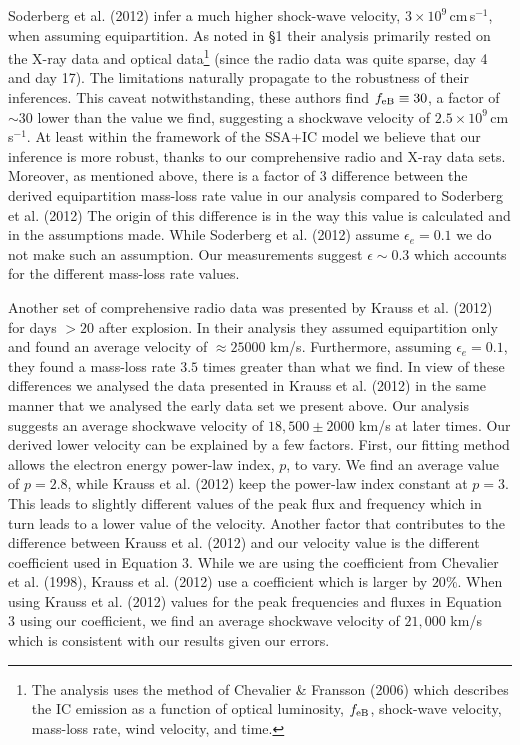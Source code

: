 \documentclass{emulateapj}
\begin{document}
Soderberg et al. (2012) infer a much higher shock-wave velocity, $3\times
10^9$\,cm\,s$^{-1}$, when assuming equipartition. As noted in \S1
their analysis primarily rested on the X-ray data and optical data\footnote{
The analysis uses the method of Chevalier
\& Fransson (2006) which describes the IC emission as a function of optical
luminosity, $f_{\rm eB}$, shock-wave velocity, mass-loss rate, wind
velocity, and time.} 
(since the
radio data was quite sparse, day 4 and day 17). The limitations 
naturally propagate to the robustness of their inferences. This caveat notwithstanding, 
these authors find $f_{\rm eB}\equiv 30$, a factor of $\sim 30$ lower
than the value we find, suggesting a shockwave velocity of $2.5 \times 10^9$\,cm\,s$^{-1}$.  At least within the framework of the SSA+IC
 model we believe that our inference is more robust, thanks to our comprehensive
 radio and X-ray data sets. Moreover, as mentioned above, there is a
 factor of $3$ difference between the derived equipartition mass-loss
 rate value in our analysis compared to Soderberg et al. (2012) The origin of
 this difference is in the way this value is calculated and in the
 assumptions made. While Soderberg et al. (2012) assume $\epsilon_{e}=0.1$
 we do not make such an assumption. Our measurements suggest
 $\epsilon \sim 0.3$ which accounts for the different mass-loss rate
 values. 
 
Another set of comprehensive radio data was presented by Krauss et
al. (2012) for days $>20$ after explosion. In their analysis they
assumed equipartition only and found an average velocity of $\approx
25000$ km/s. Furthermore, assuming $\epsilon_{e}=0.1$, they found a
mass-loss rate $3.5$ times greater than what we find. In view of these
differences we analysed the data presented in Krauss et al. (2012) in
the same manner that we analysed the early data set we present above. Our
analysis suggests an average shockwave velocity of $18,500\pm 2000$
km/s at later times. Our derived lower velocity can be explained by a
few factors. First, our fitting method allows the electron energy
power-law index, $p$, to vary. We find an average value of $p=2.8$,
while Krauss et al. (2012) keep the power-law index constant at $p=3$. This
leads to slightly different values of the peak flux and frequency
which in turn leads to a lower value of the velocity. Another factor
that contributes to the difference between Krauss et al. (2012) and our
velocity value is the different coefficient used in Equation
$3$. While we are using the coefficient from Chevalier et al. (1998),
Krauss et al. (2012) use a coefficient which is larger by $20\%$. When
using Krauss et al. (2012) values for the peak frequencies and fluxes in
Equation $3$ using our coefficient, we find an average shockwave
velocity of $21,000$ km/s which is consistent with our results
given our errors. 
\end{document}
